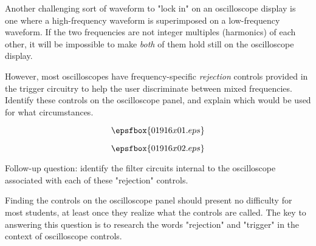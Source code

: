 

Another challenging sort of waveform to "lock in" on an oscilloscope display is one where a high-frequency waveform is superimposed on a low-frequency waveform.  If the two frequencies are not integer multiples (harmonics) of each other, it will be impossible to make {\it both} of them hold still on the oscilloscope display.

However, most oscilloscopes have frequency-specific {\it rejection} controls provided in the trigger circuitry to help the user discriminate between mixed frequencies.  Identify these controls on the oscilloscope panel, and explain which would be used for what circumstances.

$$\epsfbox{01916x01.eps}$$







$$\epsfbox{01916x02.eps}$$

\vskip 10pt

Follow-up question: identify the filter circuits internal to the oscilloscope associated with each of these "rejection" controls.







Finding the controls on the oscilloscope panel should present no difficulty for most students, at least once they realize what the controls are called.  The key to answering this question is to research the words "rejection" and "trigger" in the context of oscilloscope controls.




